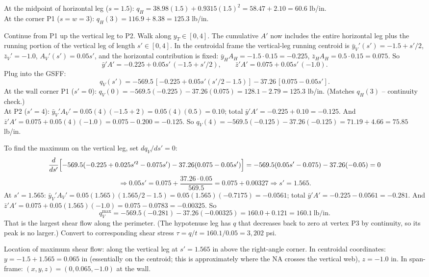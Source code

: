 \documentclass[11pt]{article}
\begin{document}
At the midpoint of horizontal leg ($s = 1.5$): $q_H = 38.98(1.5) + 0.9315(1.5)^2 = 58.47 + 2.10 = 60.6$ lb/in.\\
At the corner P1 ($s = w = 3$): $q_H(3) = 116.9 + 8.38 = 125.3$ lb/in.

Continue from P1 up the vertical leg to P2. Walk along $y_T \in [0, 4]$. The cumulative $A'$ now includes the entire horizontal leg plus the running portion of the vertical leg of length $s' \in [0, 4]$. In the centroidal frame the vertical-leg running centroid is $\bar y_V'(s') = -1.5 + s'/2$, $\bar z_V' = -1.0$, $A_V'(s') = 0.05 s'$, and the horizontal contribution is fixed: $\bar y_H A_H = -1.5 \cdot 0.15 = -0.225$, $\bar z_H A_H = 0.5 \cdot 0.15 = 0.075$. So
$$\bar y' A' = -0.225 + 0.05 s'\,(-1.5 + s'/2),\qquad \bar z' A' = 0.075 + 0.05 s'\,(-1.0).$$
Plug into the GSFF:
$$q_V(s') = -569.5\,[-0.225 + 0.05 s'(s'/2 - 1.5)] - 37.26\,[0.075 - 0.05 s'].$$
At the wall corner P1 ($s' = 0$): $q_V(0) = -569.5(-0.225) - 37.26(0.075) = 128.1 - 2.79 = 125.3$ lb/in. (Matches $q_H(3)$ -- continuity check.)\\
At P2 ($s' = 4$): $\bar y_V' A_V' = 0.05(4)(-1.5 + 2) = 0.05(4)(0.5) = 0.10$; total $\bar y' A' = -0.225 + 0.10 = -0.125$. And $\bar z' A' = 0.075 + 0.05(4)(-1.0) = 0.075 - 0.200 = -0.125$. So $q_V(4) = -569.5(-0.125) - 37.26(-0.125) = 71.19 + 4.66 = 75.85$ lb/in.

To find the maximum on the vertical leg, set $dq_V/ds' = 0$:
$$\frac{d}{ds'}\Bigl[-569.5(-0.225 + 0.025 s'^2 - 0.075 s') - 37.26(0.075 - 0.05 s')\Bigr] = -569.5(0.05 s' - 0.075) - 37.26(-0.05) = 0$$
$$\Rightarrow 0.05 s' = 0.075 + \frac{37.26 \cdot 0.05}{569.5} = 0.075 + 0.00327 \Rightarrow s' = 1.565.$$
At $s' = 1.565$: $\bar y_V' A_V' = 0.05(1.565)(1.565/2 - 1.5) = 0.05(1.565)(-0.7175) = -0.0561$; total $\bar y' A' = -0.225 - 0.0561 = -0.281$. And $\bar z' A' = 0.075 + 0.05(1.565)(-1.0) = 0.075 - 0.0783 = -0.00325$. So
$$q_V^{\max} = -569.5(-0.281) - 37.26(-0.00325) = 160.0 + 0.121 = 160.1\ \text{lb/in}.$$
That is the largest shear flow along the perimeter. (The hypotenuse leg has $q$ that decreases back to zero at vertex P3 by continuity, so its peak is no larger.) Convert to corresponding shear stress $\tau = q/t = 160.1/0.05 = 3{,}202$ psi.

Location of maximum shear flow: along the vertical leg at $s' = 1.565$ in above the right-angle corner. In centroidal coordinates: $y = -1.5 + 1.565 = 0.065$ in (essentially on the centroid; this is approximately where the NA crosses the vertical web), $z = -1.0$ in. In span-frame: $(x, y, z) = (0, 0.065, -1.0)$ at the wall.
\end{document}
